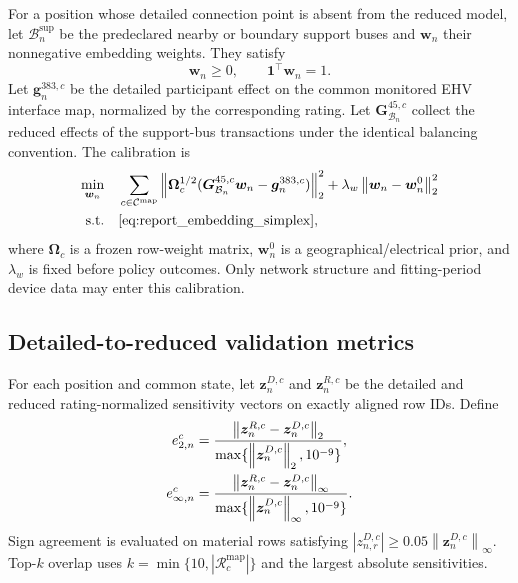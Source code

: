 \documentclass[10pt,journal,onecolumn]{IEEEtran}
\newcommand{\one}{\mathbf{1}}
\newcommand{\norm}[1]{\left\lVert#1\right\rVert}
\begin{document}
For a position whose detailed connection point is absent from the reduced
model, let $\mathcal B_n^{\mathrm{sup}}$ be the predeclared nearby or boundary
support buses and $\bm w_n$ their nonnegative embedding weights. They satisfy
\begin{equation}
\bm w_n\geq0,
\qquad
\one^\top\bm w_n=1.
\label{eq:report_embedding_simplex}
\end{equation}
Let $\bm g_{n}^{383,c}$ be the detailed participant effect on the common
monitored EHV interface map, normalized by the corresponding rating. Let
$\bm G_{\mathcal B_n}^{45,c}$ collect the reduced effects of the support-bus
transactions under the identical balancing convention. The calibration is
\begin{align}
\min_{\bm w_n}\quad
&\sum_{c\in\mathcal C^{\mathrm{map}}}
\norm{\bm\Omega_c^{1/2}
(\bm G_{\mathcal B_n}^{45,c}\bm w_n-\bm g_n^{383,c})}_2^2
+\lambda_w\norm{\bm w_n-\bm w_n^0}_2^2
\label{eq:report_embedding_qp}\\
\mathrm{s.t.}\quad
&\eqref{eq:report_embedding_simplex},
\notag
\end{align}
where $\bm\Omega_c$ is a frozen row-weight matrix, $\bm w_n^0$ is a
geographical/electrical prior, and $\lambda_w$ is fixed before policy
outcomes. Only network structure and fitting-period device data may enter this
calibration.

\subsection{Detailed-to-reduced validation metrics}

For each position and common state, let
$\bm z_n^{D,c}$ and $\bm z_n^{R,c}$ be the detailed and reduced
rating-normalized sensitivity vectors on exactly aligned row IDs. Define
\begin{align}
e_{2,n}^c
&=\frac{\norm{\bm z_n^{R,c}-\bm z_n^{D,c}}_2}
{\max\{\norm{\bm z_n^{D,c}}_2,10^{-9}\}},
\notag\\
e_{\infty,n}^c
&=\frac{\norm{\bm z_n^{R,c}-\bm z_n^{D,c}}_\infty}
{\max\{\norm{\bm z_n^{D,c}}_\infty,10^{-9}\}}.
\label{eq:report_embedding_errors}
\end{align}
Sign agreement is evaluated on material rows satisfying
$|z_{n,r}^{D,c}|\geq0.05\norm{\bm z_n^{D,c}}_\infty$. Top-$k$ overlap uses
$k=\min\{10,|\mathcal R_c^{\mathrm{map}}|\}$ and the largest absolute
sensitivities.
\end{document}
